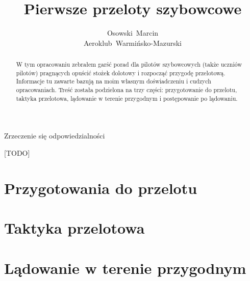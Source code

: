 \documentclass{article}
\title{Pierwsze przeloty szybowcowe}
\author{Osowski~Marcin\\Aeroklub~Warmińsko-Mazurski}
\begin{document}
\maketitle
\newpage

\begin{abstract}
W tym opracowaniu zebrałem garść porad dla pilotów szybowcowych
(także uczniów pilotów) pragnących opuścić stożek dolotowy i rozpocząć
przygodę przelotową. Informacje tu zawarte bazują na moim
własnym doświadczeniu i cudzych opracowaniach. Treść została
podzielona na trzy części: przygotowanie do przelotu, taktyka przelotowa, 
lądowanie w terenie przygodnym i postępowanie po lądowaniu.
\end{abstract}
\newpage

\begin{center}\begin{huge}
Zrzeczenie się odpowiedzialności
\end{huge}\end{center}
[TODO]
%
\newpage

\tableofcontents
\newpage

\section{Przygotowania do przelotu}
\newpage

\section{Taktyka przelotowa}
\newpage

\section{Lądowanie w terenie przygodnym}
\end{document}
